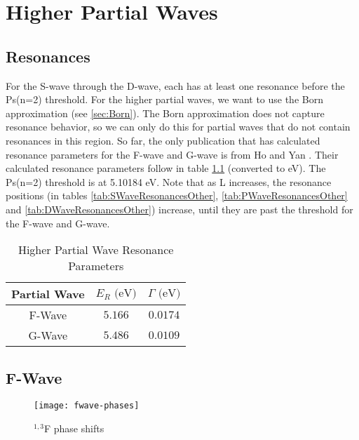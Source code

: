 \documentclass[Dissertation.tex]{subfiles}
\begin{document}
\clearpage
\pagebreak
\newpage

\chapter{Higher Partial Waves}
\label{chp:HigherWaves}


\section{Resonances}
For the S-wave through the D-wave, each has at least one resonance before the Ps(n=2) threshold. For the higher partial waves, we want to use the Born approximation (see \ref{sec:Born}). The Born approximation does not capture resonance behavior, so we can only do this for partial waves that do not contain resonances in this region. So far, the only publication that has calculated resonance parameters for the F-wave and G-wave is from Ho and Yan \cite{Ho2000}. Their calculated resonance parameters follow in table \ref{tab:HigherResonancesOther} (converted to eV). The Ps(n=2) threshold is at 5.10184 eV. Note that as L increases, the resonance positions (in tables \ref{tab:SWaveResonancesOther}, \ref{tab:PWaveResonancesOther} and \ref{tab:DWaveResonancesOther}) increase, until they are past the threshold for the F-wave and G-wave. 

\setlength{\abovecaptionskip}{6pt}
\setlength{\belowcaptionskip}{6pt}
\begin{table}[H]
\centering
\begin{tabular}{c c c}
\toprule
Partial Wave & $E_R \text{ (eV)}$ & $\Gamma \text{ (eV)}$ \\
\midrule
F-Wave & $5.166$ & $0.0174$ \\
G-Wave & $5.486$ & $0.0109$ \\
\bottomrule
\end{tabular}
\caption{Higher Partial Wave Resonance Parameters} %
\label{tab:HigherResonancesOther}
\end{table}


\section{F-Wave}
\label{sec:FWave}

\begin{figure}[H]
	\centering
	\texttt{[image: fwave-phases]}
	\caption{$^{1,3}$F phase shifts}
	\label{fig:FWavePhase}
\end{figure}
\end{document}
